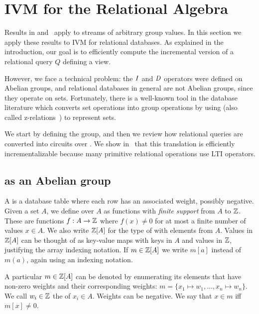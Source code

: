 \section{IVM for the Relational Algebra}\label{sec:relational}

Results in  and~
apply to streams of arbitrary group values.  In this
section we apply these results to
IVM for relational databases.  As explained in the introduction, our goal is to
efficiently compute the incremental version of a relational query $Q$
defining a view.

However, we face a technical problem: the $\mathit{I}$ and $\mathit{D}$ operators were
defined on Abelian groups, and relational databases in general are
not Abelian groups, since they operate on sets.  Fortunately,
there is a well-known tool in the database literature
which converts set operations into group operations by using \zrs
(also called z-relations~\cite{green-tcs11}) to represent sets.

We start by defining the \zrs group, and then we review how relational
queries are converted into \dbsp circuits over \zrs.  We show
in~ that this translation is
efficiently incrementalizable because many primitive relational
operations use LTI \zr operators.

\vspace{-3ex}

\subsection{\zrs as an Abelian group}

A \zr is a database table where each row has an associated weight,
possibly negative.  Given a set $A$, we define  over $A$
as functions with \emph{finite support} from $A$ to $\mathbb{Z}$.  These are
functions $f: A \rightarrow \mathbb{Z}$ where $f(x) \not= 0$ for at most a
finite number of values $x \in A$.  We also write $\mathbb{Z}[A]$ for the type
of \zrs with elements from $A$.  Values in $\mathbb{Z}[A]$ can be thought of
as key-value maps with keys in $A$ and values in $\mathbb{Z}$, justifying the
array indexing notation.  If $m \in \mathbb{Z}[A]$ we write $m[a]$ instead of
$m(a)$, again using an indexing notation.

A particular \zr $m \in \mathbb{Z}[A]$ can be denoted by enumerating its
elements that have non-zero weights and their corresponding weights:
$m = \{ x_1 \mapsto w_1, \dots, x_n \mapsto w_n \}$.
We call $w_i \in \mathbb{Z}$ the 
of $x_i \in A$.  Weights can be negative.
We say that $x \in m$ iff $m[x] \not= 0$.

